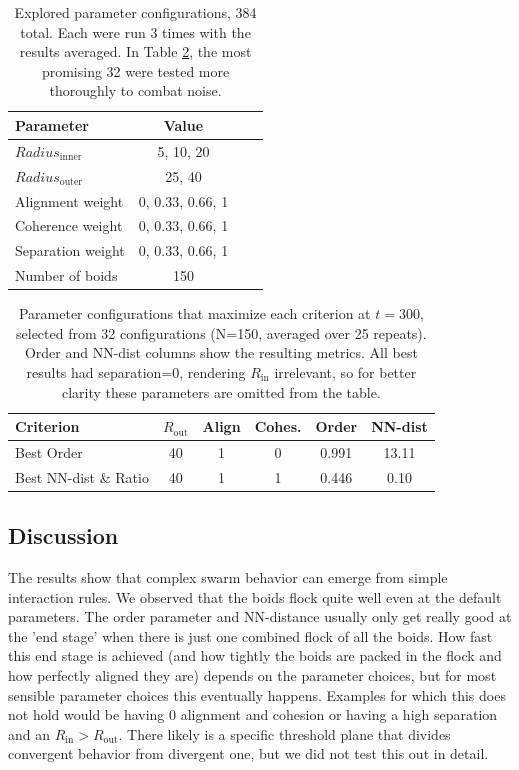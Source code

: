 \documentclass{article}
\begin{document}
\begin{table}[H]
    \centering
    \begin{tabular}{lccc}
        \hline
        \textbf{Parameter} & \textbf{Value}\\
        \hline
        $Radius_{\text{inner}}$ & 5, 10, 20 \\
        $Radius_{\text{outer}}$ & 25, 40 \\
        Alignment weight & 0, 0.33, 0.66, 1 \\
        Coherence weight & 0, 0.33, 0.66, 1 \\
        Separation weight & 0, 0.33, 0.66, 1 \\
        Number of boids & 150 \\
        \hline
    \end{tabular}
    \caption{Explored parameter configurations, 384 total. Each were run 3 times with the results averaged. In Table \ref{tab:param_ranking}, the most promising 32 were tested more thoroughly to combat noise.}
    \label{tab:paramss}
\end{table}


\begin{table}[H]
    \centering
    \begin{tabular}{lccc|cc}
        \toprule
        \textbf{Criterion} & \textbf{$R_{\text{out}}$} & \textbf{Align} & \textbf{Cohes.} & \textbf{Order} & \textbf{NN-dist} \\
        \midrule
        Best Order              & 40 & 1 & 0 & 0.991 & 13.11 \\
        Best NN-dist \& Ratio   & 40 & 1 & 1 & 0.446 & 0.10  \\
        \bottomrule
    \end{tabular}
    \caption{Parameter configurations that maximize each criterion at $t=300$, selected from 32 configurations (N=150, averaged over 25 repeats). Order and NN-dist columns show the resulting metrics. All best results had separation=0, rendering $R_{\text{in}}$ irrelevant, so for better clarity these parameters are omitted from the table.}
    \label{tab:param_ranking}
\end{table}



\subsection{Discussion}


The results show that complex swarm behavior can emerge from simple interaction rules. We observed that the boids flock quite well even at the default parameters. The order parameter and NN-distance usually only get really good at the 'end stage' when there is just one combined flock of all the boids. How fast this end stage is achieved (and how tightly the boids are packed in the flock and how perfectly aligned they are) depends on the parameter choices, but for most sensible parameter choices this eventually happens. Examples for which this does not hold would be having $0$ alignment and cohesion or having a high separation and an $R_{\text{in}} > R_{\text{out}}$. There likely is a specific threshold plane that divides convergent behavior from divergent one, but we did not test this out in detail.
\end{document}
